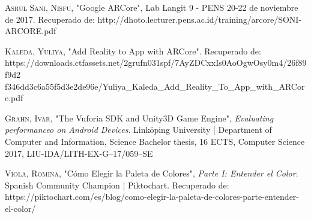 \begin{thebibliography}{X}
	 \textsc{Asrul Sani, Nisfu}, "Google ARCore", Lab Langit 9 - PENS 20-22 de noviembre de 2017. Recuperado de: http://dhoto.lecturer.pens.ac.id/training/arcore/SONI-ARCORE.pdf
	
	 \textsc{Kaleda, Yuliya}, "Add Reality to App with ARCore". Recuperado de: https://downloads.ctfassets.net/2grufn031spf/7AyZDCxxIs0AoOgwOsy0m4/26f89f9d2
	f346dd3c6a55f5d3e2de96e/Yuliya\_Kaleda\_Add\_Reality\_To\_App\_with\_ARCore.pdf
	
	 \textsc{Grahn, Ivar}, "The Vuforia SDK and Unity3D Game Engine", \textit{Evaluating performanceo on Android Devices}. Linköping University | Department of Computer and Information, Science Bachelor thesis, 16 ECTS, Computer Science 2017, LIU-IDA/LITH-EX-G–17/059–SE
	
	 \textsc{Viola, Romina}, "Cómo Elegir la Paleta de Colores", \textit{Parte I: Entender el Color}. Spanish Community Champion | Piktochart. Recuperado de: https://piktochart.com/es/blog/como-elegir-la-paleta-de-colores-parte-entender-el-color/
	
	
\end{thebibliography}
